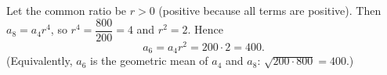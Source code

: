 Let the common ratio be $r>0$ (positive because all terms are positive). Then $a_8=a_4r^4$, so $r^4=\dfrac{800}{200}=4$ and $r^2=2$. Hence
\[
a_6=a_4r^2=200\cdot2=\boxed{400}.
\]
(Equivalently, $a_6$ is the geometric mean of $a_4$ and $a_8$: $\sqrt{200\cdot800}=400$.)
